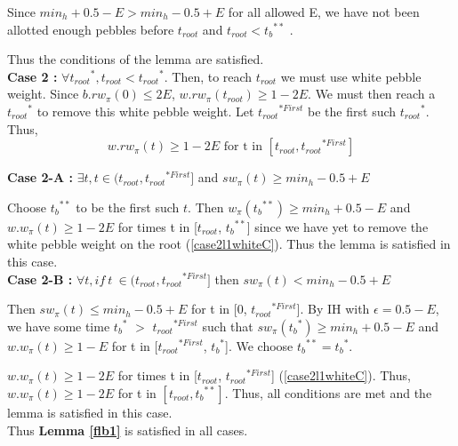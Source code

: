 \documentclass[12pt]{article}
\newenvironment{proofL}{\hspace{.4em}}
                      {\hspace{\fill}{$\blacksquare$} \smallskip}
\newcommand{\troot}{t_{root}}
\newcommand{\troots}{{t_{root}}^*}
\newcommand{\tbss}{{t_b}^{**}}
\newcommand{\tbs}{{t_b}^{*}}
\newcommand{\trootsFirst}{{t_{root}}^{*First}}
\begin{document}
\begin{proofL}
Since $min_h+0.5-E > min_h-0.5+E$ for all allowed E, we have not been allotted enough pebbles before $\troot$ and $\troot < \tbss$ . 

Thus the conditions of the lemma are satisfied.\\


 
\noindent
{\bf Case 2 :} $\forall \troots, \troot < \troots$. Then, to reach $\troot$ we must use white pebble weight. Since $b.rw_{\pi}(0) \leq 2E$, $w.rw_\pi(\troot) \geq 1-2E$. We must then reach a $\troots$ to remove this white pebble weight. Let $\trootsFirst$ be the first such $\troots$. Thus,
\begin{equation}w.rw_\pi(t) \geq 1-2E\textrm{ for t in }[\troot, \trootsFirst] \label{case2l1whiteC}\end{equation}



\noindent
{\bf Case 2-A :} $\exists t, t \in (\troot, \trootsFirst]$ and $sw_\pi(t) \geq min_h - 0.5+E$

Choose $\tbss$ to be the first such $t$. Then $w_\pi(\tbss) \geq min_h + 0.5-E$ and $w.w_\pi(t) \geq 1-2E$ for times t in [$\troot$, $\tbss$] since we have yet to remove the white pebble weight on the root (\ref{case2l1whiteC}). Thus the lemma is satisfied in this case.\\

\noindent
{\bf Case 2-B :} $\forall t, if~t~\in (\troot, \trootsFirst]$ then $sw_\pi(t) < min_h - 0.5+E$

Then $sw_\pi(t) \leq min_h-0.5+E$ for t in [0, $\trootsFirst$]. By IH with $\epsilon=0.5-E$, we have some time $\tbs$ $>$ $\trootsFirst$ such that $sw_\pi(\tbs) \geq min_h + 0.5-E$ and $w.w_\pi(t) \geq 1-E$ for t in [$\trootsFirst$,  $\tbs$]. We choose $\tbss = \tbs$. 

$w.w_\pi(t) \geq 1-2E$ for times t in [$\troot$, $\trootsFirst$] (\ref{case2l1whiteC}). Thus, $w.w_\pi(t) \geq 1-2E$ for t in $[\troot, \tbss]$. Thus, all conditions are met and the lemma is satisfied in this case.\\


Thus {\bf Lemma \ref{flb1}} is satisfied in all cases.

\end{proofL}\\
\end{document}
